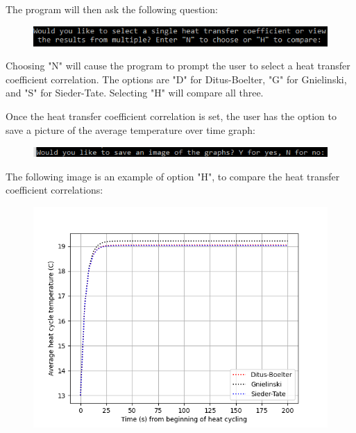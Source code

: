 \documentclass[a4paper,12pt]{article}
\begin{document}
The program will then ask the following question:

\begin{center}
\begin{figure}[h]
\centering
\includegraphics{tutorialimage3.png}
\end{figure}
\end{center}

Choosing "N" will cause the program to prompt the user to select a heat transfer coefficient correlation. The options are "D" for Ditus-Boelter, "G" for Gnielinski, and "S" for Sieder-Tate. Selecting "H" will compare all three.

\medskip

Once the heat transfer coefficient correlation is set, the user has the option to save a picture of the average temperature over time graph:

\begin{center}
\begin{figure}[h]
\centering
\includegraphics{tutorialimage4.png}
\end{figure}
\end{center}

\clearpage

The following image is an example of option "H", to compare the heat transfer coefficient correlations:

\begin{center}
\begin{figure}[h]
\centering
\includegraphics{tutorialimage5.png}
\end{figure}
\end{center}
\end{document}
